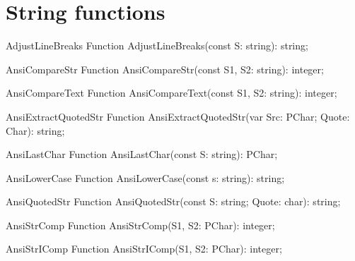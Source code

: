 \section{String functions}

\begin{function}{AdjustLineBreaks}
\Declaration
Function AdjustLineBreaks(const S: string): string;
\Description
\Errors
\SeeAlso
\end{function}

 
\begin{function}{AnsiCompareStr}
\Declaration
Function AnsiCompareStr(const S1, S2: string): integer;
\Description
\Errors
\SeeAlso
\end{function}

 
\begin{function}{AnsiCompareText}
\Declaration
Function AnsiCompareText(const S1, S2: string): integer;
\Description
\Errors
\SeeAlso
\end{function}

 
\begin{function}{AnsiExtractQuotedStr}
\Declaration
Function AnsiExtractQuotedStr(var Src: PChar; Quote: Char): string;
\Description
\Errors
\SeeAlso
\end{function}

 
\begin{function}{AnsiLastChar}
\Declaration
Function AnsiLastChar(const S: string): PChar;
\Description
\Errors
\SeeAlso
\end{function}

 
\begin{function}{AnsiLowerCase}
\Declaration
Function AnsiLowerCase(const s: string): string;
\Description
\Errors
\SeeAlso
\end{function}

 
\begin{function}{AnsiQuotedStr}
\Declaration
Function AnsiQuotedStr(const S: string; Quote: char): string;
\Description
\Errors
\SeeAlso
\end{function}

 
\begin{function}{AnsiStrComp}
\Declaration
Function AnsiStrComp(S1, S2: PChar): integer;
\Description
\Errors
\SeeAlso
\end{function}

 
\begin{function}{AnsiStrIComp}
\Declaration
Function AnsiStrIComp(S1, S2: PChar): integer;
\Description
\Errors
\SeeAlso
\end{function}

